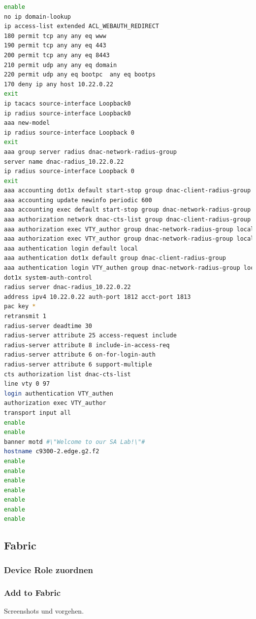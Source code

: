 \begin{lstlisting}[caption={Befehle automatisch ausgeführt durch das DNA Center während der Provisionierung},label={lst:commands-executed-during-provision},language=bash]
enable
no ip domain-lookup 
ip access-list extended ACL_WEBAUTH_REDIRECT
180 permit tcp any any eq www 
190 permit tcp any any eq 443 
200 permit tcp any any eq 8443 
210 permit udp any any eq domain 
220 permit udp any eq bootpc  any eq bootps 
170 deny ip any host 10.22.0.22
exit 
ip tacacs source-interface Loopback0 
ip radius source-interface Loopback0 
aaa new-model 
ip radius source-interface Loopback 0
exit 
aaa group server radius dnac-network-radius-group
server name dnac-radius_10.22.0.22
ip radius source-interface Loopback 0
exit 
aaa accounting dot1x default start-stop group dnac-client-radius-group
aaa accounting update newinfo periodic 600
aaa accounting exec default start-stop group dnac-network-radius-group
aaa authorization network dnac-cts-list group dnac-client-radius-group
aaa authorization exec VTY_author group dnac-network-radius-group local if-authenticated 
aaa authorization exec VTY_author group dnac-network-radius-group local 
aaa authentication login default local 
aaa authentication dot1x default group dnac-client-radius-group
aaa authentication login VTY_authen group dnac-network-radius-group local 
dot1x system-auth-control 
radius server dnac-radius_10.22.0.22
address ipv4 10.22.0.22 auth-port 1812 acct-port 1813
pac key *
retransmit 1
radius-server deadtime 30
radius-server attribute 25 access-request include 
radius-server attribute 8 include-in-access-req 
radius-server attribute 6 on-for-login-auth 
radius-server attribute 6 support-multiple 
cts authorization list dnac-cts-list
line vty 0 97
login authentication VTY_authen
authorization exec VTY_author
transport input all 
enable
enable
banner motd #\"Welcome to our SA Lab!\"#
hostname c9300-2.edge.g2.f2
enable
enable
enable
enable
enable
enable
enable
\end{lstlisting}

\subsection{Fabric}

\subsubsection{Device Role zuordnen}

\subsubsection{Add to Fabric}
Screenshots und vorgehen. 

